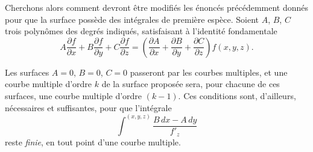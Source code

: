 \documentclass{article}
\begin{document}
Cherchons alors comment devront être modifiés les énoncés précédemment donnés pour que la surface possède des intégrales de première espèce. Soient $A$, $B$, $C$ trois polynômes des degrés indiqués, satisfaisant
à l'identité fondamentale
\[
A \frac{\partial f}{\partial x} + B \frac{\partial f}{\partial y} + C \frac{\partial f}{\partial z} = \left( \frac{\partial A}{\partial x} + \frac{\partial B}{\partial y} + \frac{\partial C}{\partial z} \right) f(x, y, z).
\]

Les surfaces $A = 0$, $B = 0$, $C = 0$ passeront par les courbes multiples, et une courbe multiple d'ordre $k$ de la surface proposée sera, pour chacune de ces surfaces, une courbe multiple d'ordre $(k - 1)$. Ces conditions sont, d'ailleurs, nécessaires et suffisantes, pour que l'intégrale
\[
\int^{(x, y, z)} \frac{B\,dx - A\,dy}{f'_{z}}
\]
reste \emph{finie}, en tout point d'une courbe multiple.
\end{document}
